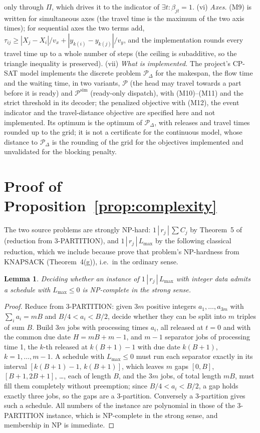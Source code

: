 \documentclass[11pt,a4paper]{article}
\theoremstyle{plain}
\newtheorem{lemma}{Lemma}
\theoremstyle{definition}
\theoremstyle{remark}
\newcommand{\Pb}{\mathcal{P}}
\newcommand{\Psim}{\Pb^{\mathrm{sim}}}
\begin{document}
only through $\Pi$, which drives it to the indicator of $\exists t:\beta_{jt}=1$.
(vi) \emph{Axes.} (M9) is written for simultaneous axes (the travel time is the maximum
of the two axis times); for sequential axes the two terms add,
$\tau_{ij}\ge|X_j-X_i|/v_x+|y_{k(i)}-y_{k(j)}|/v_y$, and the implementation rounds every
travel time up to a whole number of steps (the ceiling is subadditive, so the triangle
inequality is preserved). (vii) \emph{What is implemented.} The project's CP-SAT model
implements the discrete problem $\Pb_\Delta$ for the makespan, the flow time and the
waiting time, in two variants, $\Pb$ (the head may travel towards a part before it is
ready) and $\Psim$ (ready-only dispatch), with (M10)--(M11) and the strict threshold in
its decoder; the penalized objective with (M12), the event indicator and the
travel-distance objective are specified here and not implemented. Its optimum is the
optimum of $\Pb_\Delta$, with releases and travel times rounded up to the grid; it is not
a certificate for the continuous model, whose distance to $\Pb_\Delta$ is the rounding
of the grid for the objectives implemented and unvalidated for the blocking penalty.

\section{Proof of Proposition~\ref{prop:complexity}}\label{app:complexity}
The two source problems are strongly NP-hard: $1\,|\,r_j\,|\,\sum C_j$ by Theorem~5 of
\cite{Lenstra1977} (reduction from 3-PARTITION), and $1\,|\,r_j\,|\,L_{\max}$ by the
following classical reduction, which we include because \cite{Lenstra1977} prove that
problem's NP-hardness from KNAPSACK (Theorem~4(g)), i.e.\ in the ordinary sense.

\begin{lemma}\label{lem:lmax}
Deciding whether an instance of $1\,|\,r_j\,|\,L_{\max}$ with integer data admits a
schedule with $L_{\max}\le0$ is NP-complete in the strong sense.
\end{lemma}
\begin{proof}
Reduce from 3-PARTITION: given $3m$ positive integers $a_1,\dots,a_{3m}$ with
$\sum_ia_i=mB$ and $B/4<a_i<B/2$, decide whether they can be split into $m$ triples of
sum $B$. Build $3m$ jobs with processing times $a_i$, all released at $t=0$ and with
the common due date $H=mB+m-1$, and $m-1$ separator jobs of processing time 1, the
$k$-th released at $k(B+1)-1$ with due date $k(B+1)$, $k=1,\dots,m-1$. A schedule with
$L_{\max}\le0$ must run each separator exactly in its interval
$[k(B+1)-1,\,k(B+1)]$, which leaves $m$ gaps $[0,B]$, $[B+1,2B+1]$, \dots, each of length
$B$, and the $3m$ jobs, of total length $mB$, must fill them completely without
preemption; since $B/4<a_i<B/2$, a gap holds exactly three jobs, so the gaps are a
3-partition. Conversely a 3-partition gives such a schedule. All numbers of the
instance are polynomial in those of the 3-PARTITION instance, which is NP-complete in
the strong sense, and membership in NP is immediate.
\end{proof}
\end{document}
